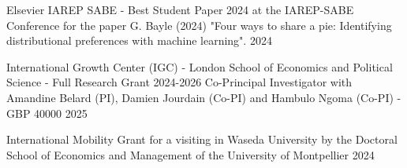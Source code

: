 

\begin{cvhonors}
  \cvhonor
    {Elsevier IAREP SABE - Best Student Paper 2024 at the IAREP-SABE Conference} %
    {for the paper G. Bayle (2024) "Four ways to share a pie: Identifying distributional preferences with machine learning".} %
    {} %
    {2024} %

    
\end{cvhonors}

\begin{cvhonors}
  \cvhonor
    {International Growth Center (IGC) - London School of Economics and Political Science - Full Research Grant 2024-2026
} %
    {Co-Principal Investigator with Amandine Belard (PI), Damien Jourdain (Co-PI) and Hambulo Ngoma (Co-PI) - GBP 40000} %
    {} %
    {2025} %

      \cvhonor
    {International Mobility Grant for a visiting in Waseda University
} %
    {by the Doctoral School of Economics and Management of the University of Montpellier} %
    {} %
    {2024} %

    
\end{cvhonors}

